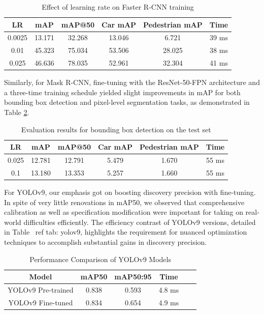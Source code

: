 \documentclass{IEEEtran}
\begin{document}
	\begin{table}[H]
		\centering
		\small
		\begin{tabular}{@{}cccccc@{}}
			\toprule
			\textbf{LR} & \textbf{mAP} & \textbf{mAP@50} & \textbf{Car mAP} & \textbf{Pedestrian mAP} & \textbf{Time} \\ \midrule
			0.0025 & 13.171 & 32.268 & 13.046 & 6.721 & 39 ms \\
			0.01 & 45.323 & 75.034 & 53.506 & 28.025 & 38 ms \\
			0.025 & 46.636 & 78.035 & 52.961 & 32.304 & 41 ms \\ \bottomrule
		\end{tabular}
		\caption{Effect of learning rate on Faster R-CNN training}
		\label{tab:faster_learning_rate_performance}
	\end{table}
	
	
	Similarly, for Mask R-CNN, fine-tuning with the ResNet-50-FPN architecture and a three-time training schedule yielded slight improvements in mAP for both bounding box detection and pixel-level segmentation tasks, as demonstrated in Table \ref{tab:mask_test_bounding_box_evaluation}.
	
	\begin{table}[H]
		\centering
		\begin{tabular}{@{}cccccc@{}}
			\toprule
			\textbf{LR} & \textbf{mAP} & \textbf{mAP@50} & \textbf{Car mAP} & \textbf{Pedestrian mAP} & \textbf{Time} \\ \midrule
			0.025 & 12.781 & 12.791 & 5.479 & 1.670 & 55 ms \\
			0.1 & 13.180 & 13.353 & 5.257 & 1.660 & 55 ms \\ \bottomrule
		\end{tabular}
		\caption{Evaluation results for bounding box detection on the test set}
		\label{tab:mask_test_bounding_box_evaluation}
	\end{table}
	
	For YOLOv9, our emphasis got on boosting discovery precision with fine-tuning. In spite of very little renovations in mAP50, we observed that comprehensive calibration as well as specification modification were important for taking on real-world difficulties efficiently. The efficiency contrast of YOLOv9 versions, detailed in Table \ ref{ tab: yolov9}, highlights the requirement for nuanced optimization techniques to accomplish substantial gains in discovery precision.
	
	\begin{table}[H]
		\centering
		\begin{tabular}{@{}cccccc@{}}
			\toprule
			\textbf{Model} & \textbf{mAP50} & \textbf{mAP50:95} & \textbf{Time} \\
			\midrule
			YOLOv9 Pre-trained & 0.838 & 0.593 & 4.8 ms \\
			YOLOv9 Fine-tuned & 0.834 & 0.654 & 4.9 ms \\
			\bottomrule
		\end{tabular}
		\caption{Performance Comparison of YOLOv9 Models}
		\label{tab:yolov9}
	\end{table}
	
\end{document}
